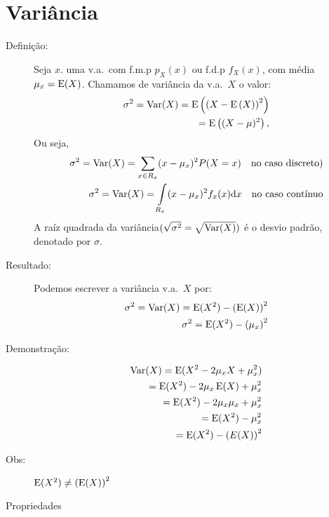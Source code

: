        \section{Variância}

       \begin{description}
         \item [Definição:] Seja $x.$ uma v.a.\ com f.m.p $p_{X}(x)$ ou f.d.p $f_{X}(x)$, com 
           média $\mu_{x}=\operatorname{E}(X)$. Chamamos de variância da v.a.\ $X$ o valor: 
           \begin{align}
             \sigma^2=\operatorname{Var}(X)=\operatorname{E}\left(\left(X-\operatorname{E}\left(X\right)\right)^2\right)\\
             =\operatorname{E} \left((X-\mu)^2\right),
           \end{align}
           Ou seja,
           \begin{align}
             \sigma^2 =\operatorname{Var}(X)=\sum \limits_{x \in R_{x}} (x-\mu_{x})^2 P(X=x) \text{\quad no caso discreto)}\\
               \sigma^2 =\operatorname{Var}(X)=\int \limits_{R_{x}} (x-\mu_{x})^2 f_{x}(x)\mathrm{d}x \text{\quad no caso contínuo}
             \end{align}
             A raíz quadrada da variância$(\sqrt{\sigma^2}=\sqrt{\operatorname{Var}(X)})$ é o desvio padrão, 
             denotado por $\sigma$.

           \item [Resultado:] Podemos escrever a variância v.a.\ $X$ por: 
             \begin{align}
               \sigma^2 =\operatorname{Var}(X)=\operatorname{E}(X^2)-\left(\operatorname{E}(X)\right)^2\\
               \sigma^2 =\operatorname{E}(X^2)-\left(\mu_x\right)^2
             \end{align}
           \item [Demonstração:] 
             \begin{align}
               \operatorname{Var}(X)=\operatorname{E}(X^2-2\mu_{x}X+\mu_{x}^2)\\
               =\operatorname{E}(X^2)-2\mu_{x}\operatorname{E}(X)+\mu_{x}^2\\
               =\operatorname{E}(X^2)-2\mu_{x}\mu_{x}+\mu_{x}^2\\
               =\operatorname{E}(X^2)-\mu_{x}^2\\
               =\operatorname{E}(X^2)-\left(E(X)\right)^2
             \end{align}
           \item [Obs:] $\operatorname{E}(X^2) \neq \left(\operatorname{E}(X)\right)^2$

           \item [Propriedades]


\end{description}
